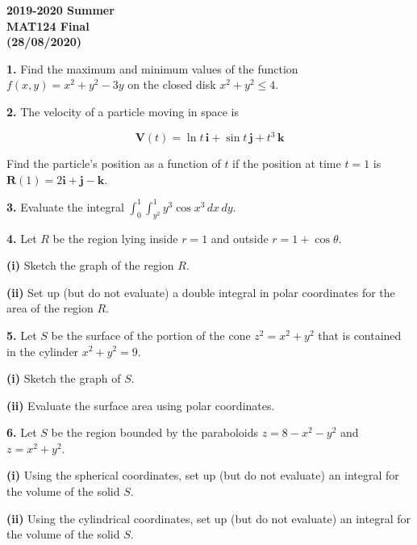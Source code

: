 \documentclass{article}
\begin{document}
\pagestyle{empty}
\large

\begin{center}
\textbf{2019-2020 Summer \\MAT124 Final\\(28/08/2020)}
\end{center}

\textbf{1.} Find the maximum and minimum values of the function $f(x,y)=x^2+y^2-3y$ on the closed disk $x^2+y^2\leq4$.

\vspace{1em}

\textbf{2.} The velocity of a particle moving in space is

\[\mathbf{V}(t)=\ln t\,\mathbf{i} +\sin t\,\mathbf{j}+ t^3\,\mathbf{k}\]

Find the particle's position as a function of $t$ if the position at time $t=1$ is $\mathbf{R}(1)=2\mathbf{i}+\mathbf{j}-\mathbf{k}$.

\vspace{1em}

\textbf{3.} Evaluate the integral $\displaystyle \int_0^1\int_{y^2}^1 y^3\cos x^3\,dx\,dy$.

\vspace{1em}

\textbf{4.} Let $R$ be the region lying inside $r=1$ and outside $r=1+\cos\theta$.

\textbf{(i)} Sketch the graph of the region $R$.

\textbf{(ii)} Set up (but do not evaluate) a double integral in polar coordinates for the area of the region $R$.

\vspace{1em}

\textbf{5.} Let $S$ be the surface of the portion of the cone $z^2=x^2+y^2$ that is contained in the cylinder $x^2+y^2=9$.

\textbf{(i)} Sketch the graph of $S$.

\textbf{(ii)} Evaluate the surface area using polar coordinates.

\vspace{1em}

\textbf{6.} Let $S$ be the region bounded by the paraboloids $z=8-x^2-y^2$ and $z=x^2+y^2$.

\textbf{(i)} Using the spherical coordinates, set up (but do not evaluate) an integral for the volume of the solid $S$.

\textbf{(ii)} Using the cylindrical coordinates, set up (but do not evaluate) an integral for the volume of the solid $S$.
\end{document}

